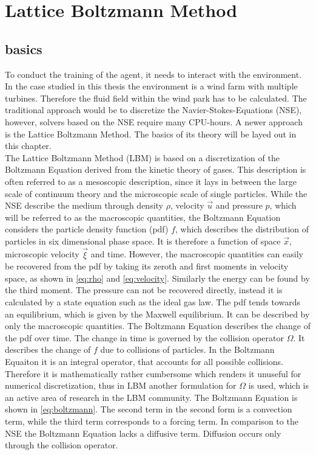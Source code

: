\chapter{Lattice Boltzmann Method}
\section{basics}
To conduct the training of the agent, it needs to interact with the environment. In the case studied in this thesis the environment is a wind farm with multiple turbines. Therefore the fluid field within the wind park has to be calculated. The traditional approach would be to discretize the Navier-Stokes-Equations (NSE), however, solvers based on the NSE require many CPU-hours. A newer approach is the Lattice Boltzmann Method. The basics of its theory will be layed out in this chapter. \\ 
The Lattice Boltzmann Method (LBM) is based on a discretization of the Boltzmann Equation derived from the kinetic theory of gases. This description is often referred to as a mesoscopic description, since it lays in  between the large scale of continuum theory and the microscopic scale of single particles. While the NSE describe the medium through density $\rho$, velocity $\vec{u}$ and pressure $p$, which will be referred to as the macroscopic quantities, the Boltzmann Equation considers the particle density function (pdf) $f$, which describes the distribution of particles in six dimensional phase space. It is therefore a function of space $\vec{x}$, microscopic velocity $\vec{\xi}$ and time. However, the macroscopic quantities can easily be recovered from the pdf by taking its zeroth and first moments in velocity space, as shown in \eqref{eq:rho} and \eqref{eq:velocity}. Similarly the energy can be found by the third moment. The pressure can not be recovered directly, instead it is calculated by a state equation such as the ideal gas law. The pdf tends towards an equilibrium, which is given by the Maxwell equilibrium. It can be described by only the macroscopic quantities.
The Boltzmann Equation describes the change of the pdf over time. The change in time is governed by the collision operator $\Omega$. It describes the change of $f$ due to collisions of particles. In the Boltzmann Equaiton it is an integral operator, that accounts for all possible collisions. Therefore it is mathematically rather cumbersome which renders it unuseful for numerical discretization, thus in LBM another formulation for $\Omega$ is used, which is an active area of research in the LBM community\cite{coreixas_comprehensive_2019}. The Boltzmann Equation is shown in \eqref{eq:boltzmann}. The second term in the second form is a convection term, while the third term corresponds to a forcing term. In comparison to the NSE the Boltzmann Equation lacks a diffusive term. Diffusion occurs only through the collision operator. \cite{Krueger}
